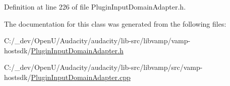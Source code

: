 Definition at line 226 of file Plugin\+Input\+Domain\+Adapter.\+h.



The documentation for this class was generated from the following files\+:\begin{DoxyCompactItemize}
\item 
C\+:/\+\_\+dev/\+Open\+U/\+Audacity/audacity/lib-\/src/libvamp/vamp-\/hostsdk/\hyperlink{_plugin_input_domain_adapter_8h}{Plugin\+Input\+Domain\+Adapter.\+h}\item 
C\+:/\+\_\+dev/\+Open\+U/\+Audacity/audacity/lib-\/src/libvamp/src/vamp-\/hostsdk/\hyperlink{_plugin_input_domain_adapter_8cpp}{Plugin\+Input\+Domain\+Adapter.\+cpp}\end{DoxyCompactItemize}
